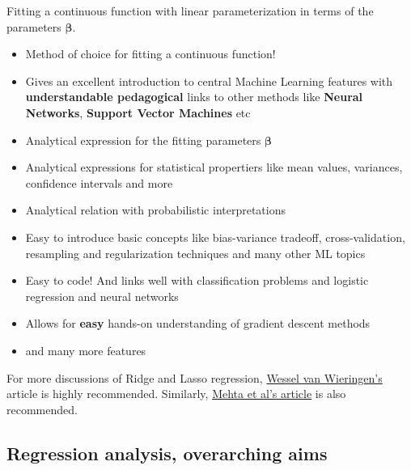 \documentclass[%
oneside,                 %
final,                   %
10pt]{article}
\begin{document}
Fitting a continuous function with linear parameterization in terms of the parameters  $\bm{\beta}$.
\begin{itemize}
\item Method of choice for fitting a continuous function!

\item Gives an excellent introduction to central Machine Learning features with \textbf{understandable pedagogical} links to other methods like \textbf{Neural Networks}, \textbf{Support Vector Machines} etc

\item Analytical expression for the fitting parameters $\bm{\beta}$

\item Analytical expressions for statistical propertiers like mean values, variances, confidence intervals and more

\item Analytical relation with probabilistic interpretations 

\item Easy to introduce basic concepts like bias-variance tradeoff, cross-validation, resampling and regularization techniques and many other ML topics

\item Easy to code! And links well with classification problems and logistic regression and neural networks

\item Allows for \textbf{easy} hands-on understanding of gradient descent methods

\item and many more features
\end{itemize}

\noindent
For more discussions of Ridge and Lasso regression, \href{{https://arxiv.org/abs/1509.09169}}{Wessel van Wieringen's} article is highly recommended.
Similarly, \href{{https://arxiv.org/abs/1803.08823}}{Mehta et al's article} is also recommended.


\subsection*{Regression analysis, overarching aims}

\paragraph{}
\end{document}

